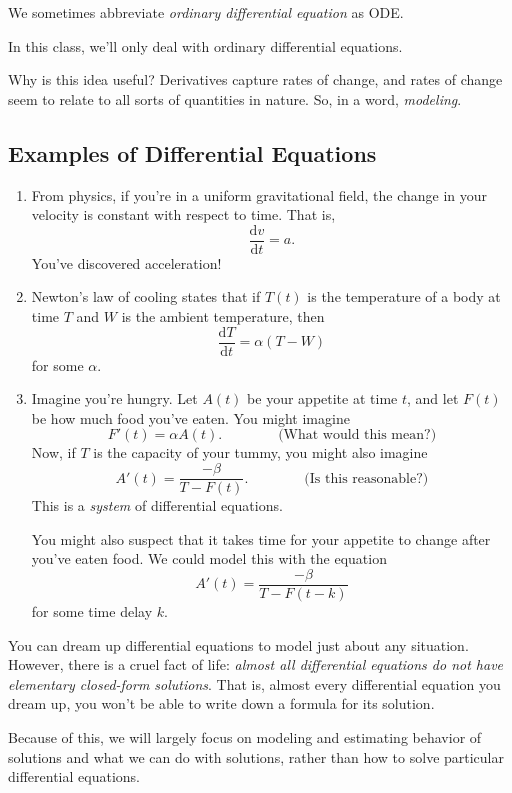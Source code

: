 \documentclass{problemset}
\renewcommand{\d}{\mathrm{d}}
\begin{document}
	We sometimes abbreviate \emph{ordinary differential equation} as ODE.

	In this class, we'll only deal with ordinary differential equations.

	Why is this idea useful?  Derivatives capture rates of change,
	and rates of change seem to relate to all sorts of quantities in nature. So, in a word,
	\emph{modeling}.

	\subsection*{Examples of Differential Equations}
	\begin{enumerate}
		\item From physics, if you're in a uniform gravitational field, the change
			in your velocity is constant with respect to time.  That is,
			\[
				\frac{\d v}{\d t} = a.
			\]
			You've discovered acceleration!
		\item Newton's law of cooling states that if $T(t)$ is the temperature
			of a body at time $T$ and $W$ is the ambient temperature, then
			\[
				\frac{ \d T}{\d t} = \alpha(T-W)
			\]
			for some $\alpha$.
		\item Imagine you're hungry.  Let $A(t)$ be your appetite at time $t$, and let
			$F(t)$ be how much food you've eaten.  You might imagine
			\[
				F'(t) = \alpha A(t). \qquad\qquad\text{(What would this mean?)}
			\]
			Now, if $T$ is the capacity of your tummy, you might also imagine
			\[
				A'(t) =\frac{-\beta}{T-F(t)}.\qquad\qquad\text{(Is this reasonable?)}
			\]
			This is a \emph{system} of differential equations.

			You might also suspect that it takes time for your appetite to change
			after you've eaten food.  We could model this with the equation
			\[
				A'(t) =\frac{-\beta}{T-F(t-k)}
			\]
			for some time delay $k$.
	\end{enumerate}

	You can dream up differential equations to model just about any situation.
	However, there is a cruel fact of life: \emph{almost all differential equations
	do not have elementary closed-form solutions}.  That is, almost
	every differential equation you dream up, you won't be able to write down
	a formula for its solution.

	Because of this, we will largely focus on modeling and estimating behavior of solutions
	and what we can do with solutions, rather than how to solve particular differential
	equations.
\end{document}
